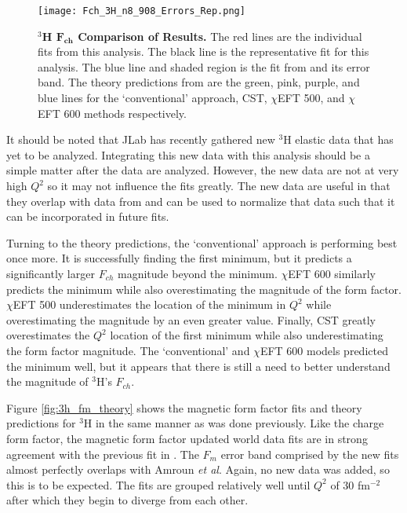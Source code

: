 \begin{figure}[!ht]
	\begin{center}
	\texttt{[image: Fch\_3H\_n8\_908\_Errors\_Rep.png]}
	\end{center}
	\caption[$^3$H $F_{ch}$ Comparison of Results]{
	{\bf{$^3$H $\boldsymbol{F_{ch}}$ Comparison of Results.}} The red lines are the individual fits from this analysis. The black line is the representative fit for this analysis. The blue line and shaded region is the fit from \cite{Article:Amroun} and its error band. The theory predictions from \cite{Article:Marcucci} are the green, pink, purple, and blue lines for the `conventional' approach, CST, $\chi$EFT 500, and $\chi$EFT 600 methods respectively.}
	\label{fig:3h_fch_theory}
\end{figure}

It should be noted that JLab has recently gathered new $^3$H elastic data that has yet to be analyzed. Integrating this new data with this analysis should be a simple matter after the data are analyzed. However, the new data are not at very high $Q^2$ so it may not influence the fits greatly. The new data are useful in that they overlap with data from \cite{Article:Beck82} and can be used to normalize that data such that it can be incorporated in future fits.

Turning to the theory predictions, the `conventional' approach is performing best once more. It is successfully finding the first minimum, but it predicts a significantly larger $F_{ch}$ magnitude beyond the minimum. $\chi$EFT 600 similarly predicts the minimum while also overestimating the magnitude of the form factor. $\chi$EFT 500 underestimates the location of the minimum in $Q^2$ while overestimating the magnitude by an even greater value. Finally, CST greatly overestimates the $Q^2$ location of the first minimum while also underestimating the form factor magnitude. The `conventional' and $\chi$EFT 600 models predicted the minimum well, but it appears that there is still a need to better understand the magnitude of $^3$H's $F_{ch}$.

Figure \ref{fig:3h_fm_theory} shows the magnetic form factor fits and theory predictions for $^3$H in the same manner as was done previously. Like the charge form factor, the magnetic form factor updated world data fits are in strong agreement with the previous fit in \cite{Article:Amroun}. The $F_m$ error band comprised by the new fits almost perfectly overlaps with Amroun \textit{et al}. Again, no new data was added, so this is to be expected. The fits are grouped relatively well until $Q^2$ of 30 fm$^{-2}$ after which they begin to diverge from each other. 

